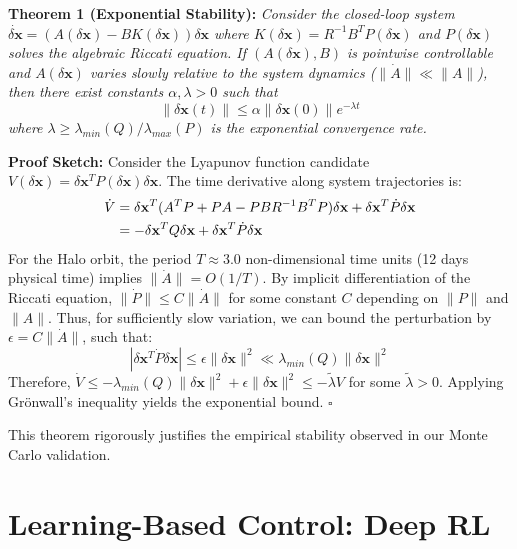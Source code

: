 \documentclass[10pt,letterpaper]{article}
\begin{document}
\textbf{Theorem 1 (Exponential Stability):} \textit{Consider the closed-loop system $\dot{\delta \mathbf{x}} = (A(\delta \mathbf{x}) - BK(\delta \mathbf{x}))\delta \mathbf{x}$ where $K(\delta \mathbf{x}) = R^{-1}B^T P(\delta \mathbf{x})$ and $P(\delta \mathbf{x})$ solves the algebraic Riccati equation. If $(A(\delta \mathbf{x}), B)$ is pointwise controllable and $A(\delta \mathbf{x})$ varies slowly relative to the system dynamics ($\|\dot{A}\| \ll \|A\|$), then there exist constants $\alpha, \lambda > 0$ such that}
\begin{equation}
    \|\delta \mathbf{x}(t)\| \leq \alpha \|\delta \mathbf{x}(0)\| e^{-\lambda t}
\end{equation}
\textit{where $\lambda \geq \lambda_{min}(Q)/\lambda_{max}(P)$ is the exponential convergence rate.}

\textbf{Proof Sketch:} Consider the Lyapunov function candidate $V(\delta \mathbf{x}) = \delta \mathbf{x}^T P(\delta \mathbf{x}) \delta \mathbf{x}$. The time derivative along system trajectories is:
\begin{align}
    \dot{V} &= \delta \mathbf{x}^T (A^T P + PA - PBR^{-1}B^TP) \delta \mathbf{x} + \delta \mathbf{x}^T \dot{P} \delta \mathbf{x} \notag \\
    &= -\delta \mathbf{x}^T Q \delta \mathbf{x} + \delta \mathbf{x}^T \dot{P} \delta \mathbf{x}
\end{align}
For the Halo orbit, the period $T \approx 3.0$ non-dimensional time units (12 days physical time) implies $\|\dot{A}\| = O(1/T)$. By implicit differentiation of the Riccati equation, $\|\dot{P}\| \leq C\|\dot{A}\|$ for some constant $C$ depending on $\|P\|$ and $\|A\|$. Thus, for sufficiently slow variation, we can bound the perturbation by $\epsilon = C \|\dot{A}\|$, such that:
\begin{equation}
    |\delta \mathbf{x}^T \dot{P} \delta \mathbf{x}| \leq \epsilon \|\delta \mathbf{x}\|^2 \ll \lambda_{min}(Q) \|\delta \mathbf{x}\|^2
\end{equation}
Therefore, $\dot{V} \leq -\lambda_{min}(Q) \|\delta \mathbf{x}\|^2 + \epsilon \|\delta \mathbf{x}\|^2 \leq -\tilde{\lambda} V$ for some $\tilde{\lambda} > 0$. Applying Grönwall's inequality yields the exponential bound. $\square$

This theorem rigorously justifies the empirical stability observed in our Monte Carlo validation.

\section{Learning-Based Control: Deep RL}
\end{document}
